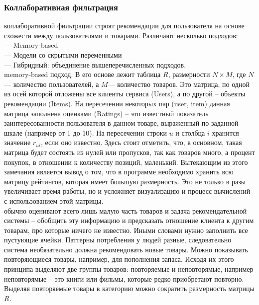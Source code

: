 \documentclass{article}
\newcommand\tab[1][1cm]{\hspace*{#1}}
\begin{document}
\subsubsection{Коллаборативная фильтрация}
 коллаборативной фильтрации строят рекомендации для пользователя на основе схожести между пользователями и товарами. Различают несколько подходов:\\
\tab— Memory-based\\
\tab— Модели со скрытыми переменными\\
\tab— Гибридный: объединение вышеперечисленных подходов.\\
 memory-based подход. В его основе лежит таблица $R$, ﻿размерности $N\times M$, где ﻿$N$﻿ — количество пользователей, а $M$— количество товаров. Это матрица, по одной из осей которой отложены все клиенты сервиса (Users), а по другой – объекты рекомендации (Items). На пересечении некоторых пар (user, item) данная матрица заполнена оценками (Ratings) – это известный показатель заинтересованности пользователя в данном товаре, выраженный по заданной шкале (например от 1 до 10). На пересечении строки $u$ и столбца ﻿$i$﻿ хранится значение ﻿$r_{ui}$﻿, если оно известно. Здесь стоит отметить, что, в основном, такая матрица будет состоять из нулей или пропусков, так как товаров много, а процент покупок, в отношении к количеству позиций, маленький. Вытекающим из этого замечания является вывод о том, что в программе необходимо хранить всю матрицу рейтингов, которая имеет большую размерность. Это не только в разы увеличивает время работы, но и усложняет визуализацию и процесс вычислений с использованием этой матрицы. \\
 обычно оценивают всего лишь малую часть товаров и задача рекомендательной системы – обобщить эту информацию и предсказать отношение клиента к другим товарам, про которые ничего не известно. Иными словами нужно заполнить все пустующие ячейки. Паттерны потребления у людей разные, следовательно система необязательно должна рекомендовать новые товары. Можно показывать повторяющиеся товары, например, для пополнения запаса. Исходя их этого принципа выделяют две группы товаров: повторяемые и неповторямые, например неповторямые – это книги или фильмы, которые редко приобретают повторно. Выделяя повторяемые товары в категорию можно сократить размерность матрицы $R$.\\
\end{document}

